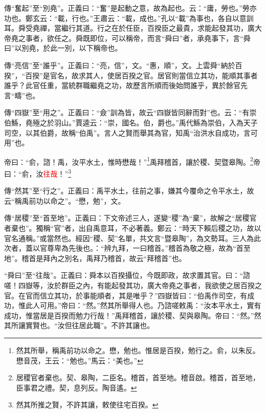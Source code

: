 {\noindent\zhuan{}\fzbyks 傳“奮起”至“別堯”。正義曰：“奮”是起動之意，故為起也。云：“庸，勞也。”勞亦功也。鄭玄云：“載，行也。”王肅云：“載，成也。”孔以“載”為事也，各自以意訓耳。舜受堯禪，當繼行其道。行之在於任臣，百揆臣之最貴，求能起發其功，廣大帝堯之事者，欲任之。舜既即位，可以稱帝，而言“舜曰”者，承堯事下，言“舜曰”以別堯，於此一別，以下稱帝也。 \par}

{\noindent\zhuan{}\fzbyks 傳“亮信”至“誰乎”。正義曰：“亮，信”，文。“惠，順”，文。上雲舜“納於百揆”，“百揆”是官名，故求其人，使居百揆之官。居官則當信立其功，能順其事者誰乎？此官任重，當統群職繼堯之功，故歷言所順而後始問誰乎，異於餘官先言“疇”也。 \par}

{\noindent\zhuan{}\fzbyks 傳“四嶽”至“用之”。正義曰：“僉”訓為皆，故云“四嶽皆同辭而對”也。云：“有崇伯鯀，堯殛之於羽山。”賈逵云：“崇，國名。伯，爵也。”禹代鯀為崇伯，入為天子司空，以其伯爵，故稱“伯禹”。言人之賢而舉其為官，知禹“治洪水自成功，言可用”也。 \par}

帝曰：“俞，諮！禹，汝平水土，惟時懋哉！”\footnote{然其所舉，稱禹前功以命之。懋，勉也。惟居是百揆，勉行之。俞，以朱反。懋音茂，王云：“勉也。”馬云：“美也。”}禹拜稽首，讓於稷、契暨皋陶。\footnote{居稷官者棄也。契、皋陶，二臣名。稽首，首至地。稽音啟。稽首，首至地，臣事君之禮。契，息列反。陶音遙。}帝曰：“俞，汝\textcolor{red}{往哉}！”\footnote{然其所推之賢，不許其讓，敕使往宅百揆。}

{\noindent\zhuan{}\fzbyks 傳“然其”至“行之”。正義曰：禹平水土，往前之事，嫌其今覆命之令平水土，故云“稱禹前功以命之”。“懋，勉”，文。 \par}

{\noindent\zhuan{}\fzbyks 傳“居稷”至“首至地”。正義曰：下文帝述三人，遂變“稷”為“棄”，故解之“居稷官者棄也”。獨稱“官”者，出自禹意耳，不必著義。鄭云：“時天下賴后稷之功，故以官名通稱。”或當然也。經因“稷、契”名單，共文言“暨皋陶”，為文勢耳。三人為此次者，蓋以官尊卑為先後也。：“辨九拜，一曰稽首。”稽首為敬之極，故為“首至地”。稽首是拜內之別名，禹拜乃稽首，故云“拜稽首”也。 \par}

{\noindent\shu{}\fzkt “舜曰”至“往哉”。正義曰：舜本以百揆攝位，今既即政，故求置其官。曰：“諮嗟！四嶽等，汝於群臣之內，有能起發其功，廣大帝堯之事者，我欲使之居百揆之官。在官而信立其功，於事能順者，其是唯乎？”四嶽皆曰：“伯禹作司空，有成功，惟此人可用。”帝曰：“然。”然其所舉得人也。乃諮嗟敕禹：“汝本平水土，實有成功，惟當居是百揆而勉力行哉！”禹拜稽首，讓於稷、契與皋陶。帝曰：“然。”然其所讓實賢也。“汝但往居此職”。不許其讓也。 \par}

